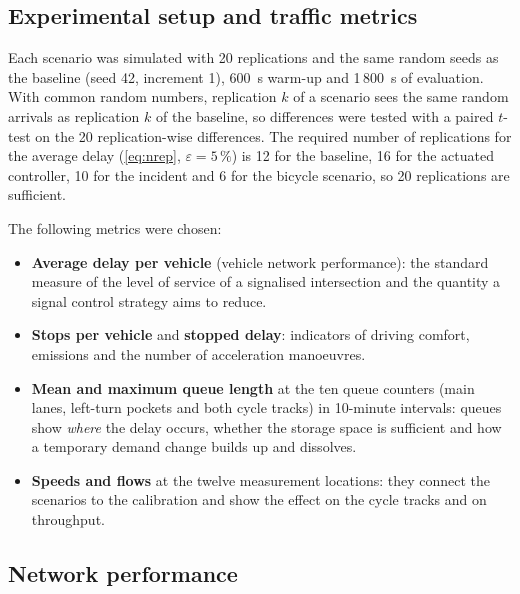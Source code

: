 \documentclass[11pt,a4paper]{article}
\begin{document}
\subsection{Experimental setup and traffic metrics}

Each scenario was simulated with 20 replications and the same random seeds as the baseline (seed
42, increment 1), 600~s warm-up and 1\,800~s of evaluation. With common random numbers, replication
$k$ of a scenario sees the same random arrivals as replication $k$ of the baseline, so differences
were tested with a paired $t$-test on the 20 replication-wise differences. The required number of
replications for the average delay (\cref{eq:nrep}, $\varepsilon = 5\,\%$) is 12 for the baseline,
16 for the actuated controller, 10 for the incident and 6 for the bicycle scenario, so 20
replications are sufficient.

The following metrics were chosen:
\begin{itemize}
  \item \textbf{Average delay per vehicle} (vehicle network performance): the standard measure of
        the level of service of a signalised intersection and the quantity a signal control
        strategy aims to reduce.
  \item \textbf{Stops per vehicle} and \textbf{stopped delay}: indicators of driving comfort,
        emissions and the number of acceleration manoeuvres.
  \item \textbf{Mean and maximum queue length} at the ten queue counters (main lanes, left-turn
        pockets and both cycle tracks) in 10-minute intervals: queues show \emph{where} the delay
        occurs, whether the storage space is sufficient and how a temporary demand change builds up
        and dissolves.
  \item \textbf{Speeds and flows} at the twelve measurement locations: they connect the scenarios
        to the calibration and show the effect on the cycle tracks and on throughput.
\end{itemize}

\subsection{Network performance}
\end{document}
